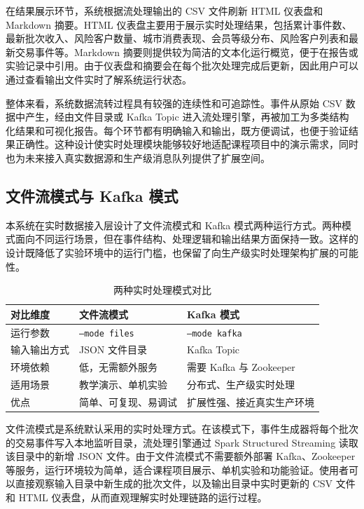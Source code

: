 \documentclass[12pt,hyperref,a4paper,UTF8]{ctexart}
\begin{document}
在结果展示环节，系统根据流处理输出的 CSV 文件刷新 HTML 仪表盘和 Markdown 摘要。HTML 仪表盘主要用于展示实时处理结果，包括累计事件数、最新批次收入、风险客户数量、城市消费表现、会员等级分布、风险客户列表和最新交易事件等。Markdown 摘要则提供较为简洁的文本化运行概览，便于在报告或实验记录中引用。由于仪表盘和摘要会在每个批次处理完成后更新，因此用户可以通过查看输出文件实时了解系统运行状态。

整体来看，系统数据流转过程具有较强的连续性和可追踪性。事件从原始 CSV 数据中产生，经由文件目录或 Kafka Topic 进入流处理引擎，再被加工为多类结构化结果和可视化报告。每个环节都有明确输入和输出，既方便调试，也便于验证结果正确性。这种设计使实时处理模块能够较好地适配课程项目中的演示需求，同时也为未来接入真实数据源和生产级消息队列提供了扩展空间。

\subsection{文件流模式与 Kafka 模式}

本系统在实时数据接入层设计了文件流模式和 Kafka 模式两种运行方式。两种模式面向不同运行场景，但在事件结构、处理逻辑和输出结果方面保持一致。这样的设计既降低了实验环境中的运行门槛，也保留了向生产级实时处理架构扩展的可能性。

\begin{table}[H]
\centering
\caption{两种实时处理模式对比}
\begin{tabular}{lll}
\toprule
对比维度 & 文件流模式 & Kafka 模式 \\
\midrule
运行参数 & \texttt{--mode files} & \texttt{--mode kafka} \\
输入输出方式 & JSON 文件目录 & Kafka Topic \\
环境依赖 & 低，无需额外服务 & 需要 Kafka 与 Zookeeper \\
适用场景 & 教学演示、单机实验 & 分布式、生产级实时处理 \\
优点 & 简单、可复现、易调试 & 扩展性强、接近真实生产环境 \\
\bottomrule
\end{tabular}
\end{table}

文件流模式是系统默认采用的实时处理方式。在该模式下，事件生成器将每个批次的交易事件写入本地监听目录，流处理引擎通过 Spark Structured Streaming 读取该目录中的新增 JSON 文件。由于文件流模式不需要额外部署 Kafka、Zookeeper 等服务，运行环境较为简单，适合课程项目展示、单机实验和功能验证。使用者可以直接观察输入目录中新生成的批次文件，以及输出目录中实时更新的 CSV 文件和 HTML 仪表盘，从而直观理解实时处理链路的运行过程。
\end{document}
